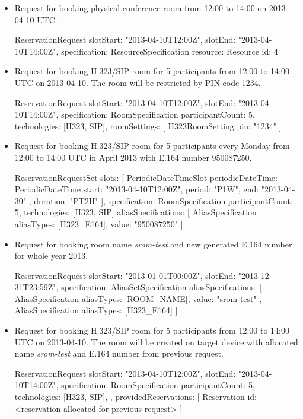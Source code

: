 \begin{itemize}

\item Request for booking physical conference room from 12:00 to 14:00 on 2013-04-10 UTC.
\begin{Entity}
ReservationRequest {
  slotStart: "2013-04-10T12:00Z",
  slotEnd:   "2013-04-10T14:00Z",
  specification: ResourceSpecification {
    resource: Resource { id: 4 }
  }
}
\end{Entity}

\item Request for booking H.323/SIP room for 5 participants from 12:00 to 14:00 UTC on 2013-04-10. The room will be restricted by PIN code 1234.
\begin{Entity}
ReservationRequest {
  slotStart: "2013-04-10T12:00Z",
  slotEnd:   "2013-04-10T14:00Z",
  specification: RoomSpecification {
    participantCount: 5,
    technologies: [H323, SIP],
    roomSettings: [
      H323RoomSetting { pin: "1234" }
    ]
  }
}
\end{Entity}

\newpage
\item Request for booking H.323/SIP room for 5 participants every Monday from 12:00 to 14:00 UTC in April 2013 with E.164 number 950087250.
\begin{Entity}
ReservationRequestSet {
  slots: [
    PeriodicDateTimeSlot {
      periodicDateTime: PeriodicDateTime {
        start:  "2013-04-10T12:00Z",
        period: "P1W",
        end:    "2013-04-30"
      },
      duration: "PT2H"
    }
  ],
  specification: RoomSpecification {
    participantCount: 5,
    technologies: [H323, SIP]
    aliasSpecifications: [
      AliasSpecification { aliasTypes: [H323_E164], value: "950087250" }
    ]
  }
}
\end{Entity}


\item Request for booking room name \textit{srom-test} and new generated E.164 number for whole year 2013.
\begin{Entity}
ReservationRequest {
  slotStart: "2013-01-01T00:00Z",
  slotEnd:   "2013-12-31T23:59Z",
  specification: AliasSetSpecification {
    aliasSpecifications: [
      AliasSpecification {
        aliasTypes: [ROOM_NAME], 
        value: "srom-test"
      },
      AliasSpecification {
        aliasTypes: [H323_E164]
      }
    ]    
  }
}
\end{Entity}

\item Request for booking H.323/SIP room for 5 participants from 12:00 to 14:00 UTC on 2013-04-10. The room will be created on target device with allocated name \textit{srom-test} and E.164 number from previous request.
\begin{Entity}
ReservationRequest {
  slotStart: "2013-04-10T12:00Z",
  slotEnd:   "2013-04-10T14:00Z",
  specification: RoomSpecification {
    participantCount: 5,
    technologies: [H323, SIP],
  },
  providedReservations: [
    Reservation { id: <reservation allocated for previous request> }
  ]
}
\end{Entity}


\end{itemize}
